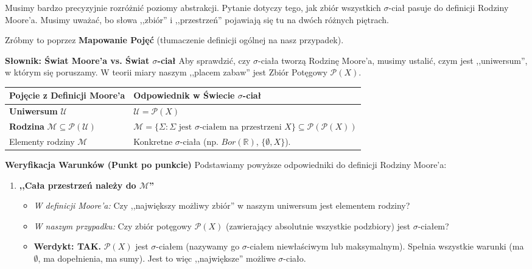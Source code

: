 \begin{contextline}

Musimy bardzo precyzyjnie rozróżnić poziomy abstrakcji. Pytanie dotyczy tego, jak zbiór wszystkich $\sigma$-ciał pasuje do definicji Rodziny Moore'a.
Musimy uważać, bo słowa ,,zbiór'' i ,,przestrzeń'' pojawiają się tu na dwóch różnych piętrach.

Zróbmy to poprzez \textbf{Mapowanie Pojęć} (tłumaczenie definicji ogólnej na nasz przypadek).

\textbf{Słownik: Świat Moore'a vs. Świat $\sigma$-ciał}
Aby sprawdzić, czy $\sigma$-ciała tworzą Rodzinę Moore'a, musimy ustalić, czym jest ,,uniwersum'', w którym się poruszamy. W teorii miary naszym ,,placem zabaw'' jest Zbiór Potęgowy $\mathcal{P}(X)$.

\begin{table}[H]
    \centering
    \renewcommand{\arraystretch}{1.4}
    \begin{tabularx}{\textwidth}{l X}
        \toprule
        \textbf{Pojęcie z Definicji Moore'a} & \textbf{Odpowiednik w Świecie $\sigma$-ciał} \\
        \midrule
	\textbf{Uniwersum } $\mathcal{U}$ & $\mathcal{U} = \mathcal{P}(X)$ \\
       \addlinespace
	\textbf{Rodzina}  $\mathcal{M} \subseteq \mathcal{P}(\mathcal{U})$ & $\mathcal{M}= \{\Sigma : \Sigma \text{ jest $\sigma$-ciałem na przestrzeni $X$}\} \subseteq \mathcal{P}(\mathcal{P}(X)) $ \\
       \addlinespace
        Elementy rodziny $\mathcal{M}$ & Konkretne $\sigma$-ciała (np. $Bor(\mathbb{R})$, $\{\emptyset, X\}$). \\
        \bottomrule
    \end{tabularx}
\end{table}

\textbf{Weryfikacja Warunków (Punkt po punkcie)}
Podstawiamy powyższe odpowiedniki do definicji Rodziny Moore'a:

\begin{enumerate}[label=\textbf{Warunek \arabic*:}, wide]
     \item \textbf{,,Cała przestrzeń należy do $\mathcal{M}$''} 
	\begin{itemize}
        \item \textit{W definicji Moore'a:} Czy ,,największy możliwy zbiór'' w naszym uniwersum jest elementem rodziny?
        \item \textit{W naszym przypadku:} Czy zbiór potęgowy $\mathcal{P}(X)$ (zawierający absolutnie wszystkie podzbiory) jest $\sigma$-ciałem?
        \item \textbf{Werdykt: TAK.} $\mathcal{P}(X)$ jest $\sigma$-ciałem (nazywamy go $\sigma$-ciałem niewłaściwym lub maksymalnym). Spełnia wszystkie warunki (ma $\emptyset$, ma dopełnienia, ma sumy). Jest to więc ,,największe'' możliwe $\sigma$-ciało.
    \end{itemize}


\end{enumerate}
\end{contextline}
